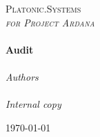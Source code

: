 \begin{titlepage}
  \begin{center}

    \textsc{\LARGE Platonic.Systems}\\[1.5cm]
    \textsc{\LARGE \textit{for Project Ardana}}\\[0.5cm]

    \HRule\\[0.4cm]
    {\huge \bfseries Audit\\[0.4cm]}
    \HRule\\[1.5cm]

    \emph{Authors}\\[0.1cm]
    \noindent{}\\[1cm]

    \emph{Internal copy}\\[0.1cm]

    \vfill

    {\large \today \ \ \currenttime}

  \end{center}
\end{titlepage}
